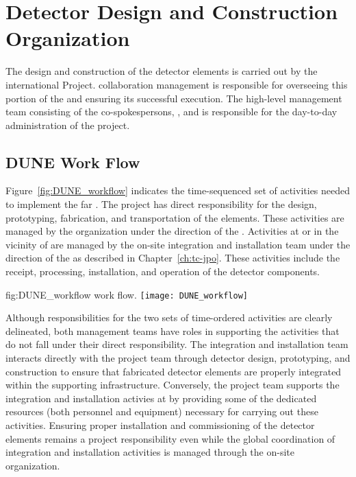﻿\chapter{Detector Design and Construction Organization}
\label{vl:tc-overview}

The design and construction of the  detector elements is 
carried out by the international  Project.  
collaboration management is responsible for overseeing this portion 
of the  and ensuring its successful execution.  
The high-level  management team consisting of the 
co-spokespersons, , and  is responsible 
for the day-to-day administration of the project.  

\section{DUNE Work Flow}
\label{sec:workflow}

Figure~\ref{fig:DUNE_workflow} indicates the time-sequenced set of 
activities needed to implement the  far .
The  project has direct responsibility for the design, 
prototyping, fabrication, and transportation of the  
elements.  These activities are managed by the   
organization under the direction of the .  Activities at 
or in the vicinity of  are managed by the on-site integration and
installation team under the direction of the  as described 
in Chapter~\ref{ch:tc-jpo}.  These activities include the receipt,
processing, installation, and operation of the detector components.            
\begin{dunefigure}{fig:DUNE_workflow}
  { work flow.}
  \texttt{[image: DUNE\_workflow]}
\end{dunefigure}

Although responsibilities for the two sets of time-ordered activities 
are clearly delineated, both management teams have roles in supporting
the activities that do not fall under their direct responsibility.  The 
integration and installation team interacts directly with the  
project team through detector design, prototyping, and construction to 
ensure that fabricated detector elements are properly integrated within 
the supporting infrastructure.  Conversely, the  project team %
supports the integration and installation activies at  by providing 
some of the dedicated resources (both personnel and equipment) necessary 
for carrying out these activities.  Ensuring proper installation and 
commissioning of the detector elements remains a  project
responsibility even while the global coordination of integration and 
installation activities is managed through the on-site organization.  

